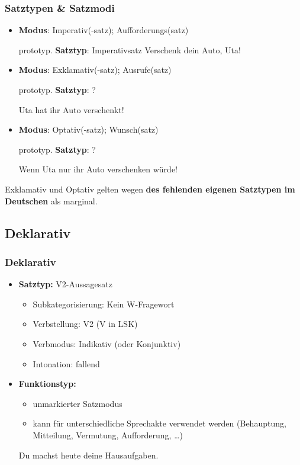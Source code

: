 \begin{frame}
\frametitle{Satztypen \& Satzmodi}


\begin{itemize}
	\item \textbf{Modus}: Imperativ(-satz); Aufforderungs(satz) 
	
	prototyp. \textbf{Satztyp}: Imperativsatz
	\ea Verschenk dein Auto, Uta!
	\z

\pause 
	
	\item \textbf{Modus}: Exklamativ(-satz); Ausrufe(satz)
	
	prototyp. \textbf{Satztyp}: ?
	
	\ea Uta hat ihr Auto verschenkt!
	\z

\pause 
	
	\item \textbf{Modus}: Optativ(-satz); Wunsch(satz)
	
	prototyp. \textbf{Satztyp}: ?
	
	\ea Wenn Uta nur ihr Auto verschenken würde!
	\z
	
\end{itemize}

Exklamativ und Optativ gelten wegen \textbf{des fehlenden eigenen Satztypen im Deutschen} als marginal.


\end{frame}


\subsection{Deklarativ}


\begin{frame}
\frametitle{Deklarativ}

\begin{itemize}
	\item \textbf{Satztyp:} V2-Aussagesatz
	\begin{itemize}
		\item Subkategorisierung: Kein W-Fragewort
		\item Verbstellung: V2 (V in LSK)
		\item Verbmodus: Indikativ (oder Konjunktiv)
		\item Intonation: fallend
	\end{itemize}
	\item \textbf{Funktionstyp:}
	\begin{itemize}
		\item unmarkierter Satzmodus
		\item kann für unterschiedliche Sprechakte verwendet werden (Behauptung, Mitteilung, Vermutung, Aufforderung, \dots )
	\end{itemize}
	
	\ea Du machst heute deine Hausaufgaben.
	\z
	
\end{itemize}

\end{frame}



